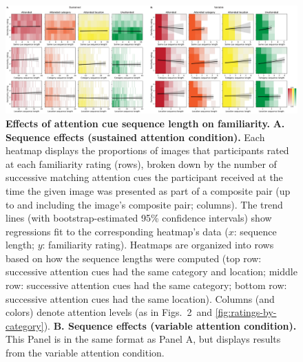 \documentclass{article}
\newcommand{\familiarity}{2}
\begin{document}
\begin{figure}[tp]
  \centering
  \includegraphics[width=1\textwidth]{figs/sequence_length_effects}

\caption{\textbf{Effects of attention cue sequence length on familiarity.} 
\textbf{A. Sequence effects (sustained attention condition).} Each heatmap
displays the proportions of images that participants rated at each familiarity
rating (rows), broken down by the number of successive matching attention cues
the participant received at the time the given image was presented as part of a
composite pair (up to and including the image's composite pair; columns). The
trend lines (with bootstrap-estimated 95\% confidence intervals) show
regressions fit to the corresponding heatmap's data ($x$: sequence length; $y$:
familiarity rating). Heatmaps are organized into rows based on how the sequence
lengths were computed (top row: successive attention cues had the same category
and location; middle row: successive attention cues had the same category;
bottom row: successive attention cues had the same location). Columns (and
colors) denote attention levels (as in Figs.~\familiarity~and
\ref{fig:ratings-by-category}). \textbf{B. Sequence effects (variable attention
condition).} This Panel is in the same format as Panel A, but displays results
from the variable attention condition.}

\label{fig:sequence-effects}
\end{figure}
\end{document}
